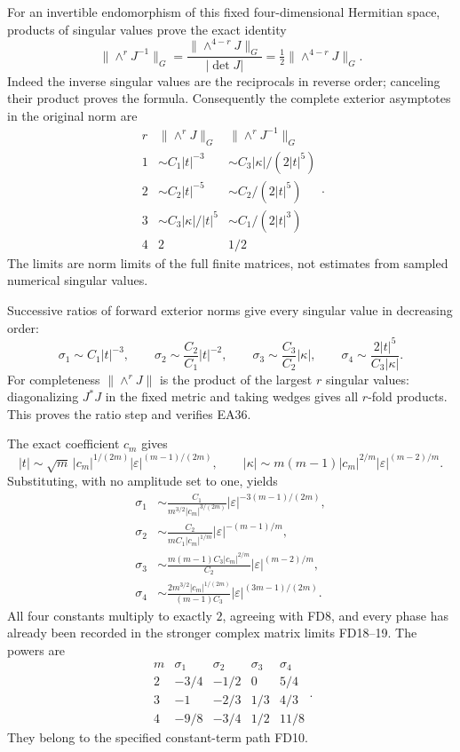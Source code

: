 \documentclass[11pt]{article}
\begin{document}
For an invertible endomorphism of this fixed four-dimensional
Hermitian space, products of singular values prove the exact
identity
\[
 \|\wedge^rJ^{-1}\|_G
            =\frac{\|\wedge^{4-r}J\|_G}{|\det J|}
            =\tfrac12\|\wedge^{4-r}J\|_G .
 \tag{FD24}
\]
Indeed the inverse singular values are the reciprocals
in reverse order; canceling their product proves the
formula. Consequently the complete exterior asymptotes
in the original norm are
\[
\begin{array}{c|c|c}
 r&\|\wedge^rJ\|_G&\|\wedge^rJ^{-1}\|_G\\\hline
 1&\sim C_1|t|^{-3}&\sim C_3|\kappa|/(2|t|^5)\\
 2&\sim C_2|t|^{-5}&\sim C_2/(2|t|^5)\\
 3&\sim C_3|\kappa|/|t|^5&\sim C_1/(2|t|^3)\\
 4&2&1/2
\end{array}.\tag{FD25}
\]
The limits are norm limits of the full finite matrices,
not estimates from sampled numerical singular values.

Successive ratios of forward exterior norms give every
singular value in decreasing order:
\[
\boxed{\quad
 \sigma_1\sim C_1|t|^{-3},\qquad
 \sigma_2\sim\frac{C_2}{C_1}|t|^{-2},\qquad
 \sigma_3\sim\frac{C_3}{C_2}|\kappa|,\qquad
 \sigma_4\sim\frac{2|t|^5}{C_3|\kappa|}.
 \quad}\tag{FD26}
\]
For completeness \(\|\wedge^rJ\|\) is the product of the
largest \(r\) singular values: diagonalizing \(J^*J\) in
the fixed metric and taking wedges gives all \(r\)-fold
products. This proves the ratio step and verifies EA36.

The exact coefficient \(c_m\) gives
\[
 |t|\sim\sqrt m\,|c_m|^{1/(2m)}
                       |\varepsilon|^{(m-1)/(2m)},\qquad
 |\kappa|\sim m(m-1)|c_m|^{2/m}
                       |\varepsilon|^{(m-2)/m}.
 \tag{FD27}
\]
Substituting, with no amplitude set to one, yields
\[
\boxed{\begin{aligned}
 \sigma_1&\sim\frac{C_1}{m^{3/2}|c_m|^{3/(2m)}}
                  |\varepsilon|^{-3(m-1)/(2m)},\\
 \sigma_2&\sim\frac{C_2}{mC_1|c_m|^{1/m}}
                  |\varepsilon|^{-(m-1)/m},\\
 \sigma_3&\sim\frac{m(m-1)C_3|c_m|^{2/m}}{C_2}
                  |\varepsilon|^{(m-2)/m},\\
 \sigma_4&\sim\frac{2m^{3/2}|c_m|^{1/(2m)}}{(m-1)C_3}
                  |\varepsilon|^{(3m-1)/(2m)}.
\end{aligned}}\tag{FD28}
\]
All four constants multiply to exactly \(2\), agreeing
with FD8, and every phase has already been recorded in
the stronger complex matrix limits FD18--19. The powers are
\[
\begin{array}{c|rrrr}
m&\sigma_1&\sigma_2&\sigma_3&\sigma_4\\\hline
2&-3/4&-1/2&0&5/4\\
3&-1&-2/3&1/3&4/3\\
4&-9/8&-3/4&1/2&11/8
\end{array}.
\]
They belong to the specified constant-term path FD10.
\end{document}
